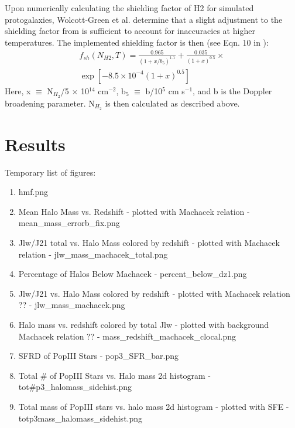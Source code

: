 \documentclass[a4paper,fleqn,usenatbib]{mnras}
\begin{document}
Upon numerically calculating the shielding factor of H2 for simulated protogalaxies, Wolcott-Green et al. determine that a slight adjustment to the shielding factor from \citet{Draine96} is sufficient to account for inaccuracies at higher temperatures. The implemented shielding factor is then (see Eqn. 10 in \citet{Wolcott11}):
\begin{equation}
	\begin{multlined}
	f_{sh}(N_{H2}, T) = \frac{0.965}{(1+x/b_{5})^{1.1}} + \frac{0.035}{(1+x)^{0.5}}  \times \\ \exp [-8.5 \times 10^{-4} (1+x)^{0.5}]
	\end{multlined}
\end{equation}
Here, x $\equiv$ N$_{H_{2}}$/5 $\times$ 10$^{14}$ cm$^{-2}$, b$_{5}$ $\equiv$ b/10$^{5}$ cm s$^{-1}$, and b is the Doppler broadening parameter. N$_{H_{2}}$ is then calculated as described above.


\section{Results}
Temporary list of figures:
\begin{enumerate}
\item hmf.png
\item Mean Halo Mass vs. Redshift - plotted with Machacek relation - mean\_mass\_errorb\_fix.png
\item Jlw/J21 total vs. Halo Mass colored by redshift - plotted with Machacek relation - jlw\_mass\_machacek\_total.png
\item Percentage of Halos Below Machacek - percent\_below\_dz1.png 
\item Jlw/J21 vs. Halo Mass colored by redshift - plotted with Machacek relation ??  - jlw\_mass\_machacek.png
\item Halo mass vs. redshift colored by total Jlw - plotted with background Machacek relation ?? - mass\_redshift\_machacek\_clocal.png
\item SFRD of PopIII Stars - pop3\_SFR\_bar.png
\item Total \# of PopIII Stars vs. Halo mass 2d histogram - tot\#p3\_halomass\_sidehist.png
\item Total mass of PopIII stars vs. halo mass 2d histogram - plotted with SFE - totp3mass\_halomass\_sidehist.png

\end{enumerate}
\end{document}
